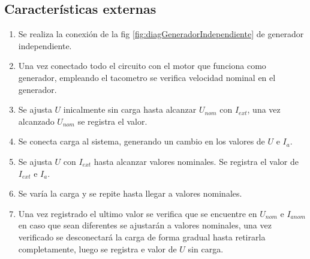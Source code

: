 \documentclass[11pt,letterpaper]{article}     %
\begin{document}
\subsection{Características externas}
\begin{enumerate}
    \item Se realiza la conexión de la fig \ref{fig:diagGeneradorIndependiente} de generador independiente.
    \item Una vez conectado todo el circuito con el motor que funciona como generador, empleando el tacometro se verifica velocidad nominal en el generador.
    \item Se ajusta $U$ inicalmente sin carga hasta alcanzar $U_{nom}$ con $I_{ext}$, una vez alcanzado $U_{nom}$ se registra el valor.
    \item Se conecta carga al sistema, generando un cambio en los valores de $U$ e $I_a$.
    \item Se ajusta $U$ con $I_{ext}$ hasta alcanzar valores nominales. Se registra el valor de $I_{ext}$ e $I_a$.
    \item Se varía la carga y se repite hasta llegar a valores nominales.
    \item Una vez registrado el ultimo valor se verifica que se encuentre en $U_{nom}$ e $I_{anom}$ en caso que sean diferentes se ajustarán a valores nominales, una vez verificado se desconectará la carga de forma gradual hasta retirarla completamente, luego se registra e valor de $U$ sin carga. 
\end{enumerate}
\end{document}

